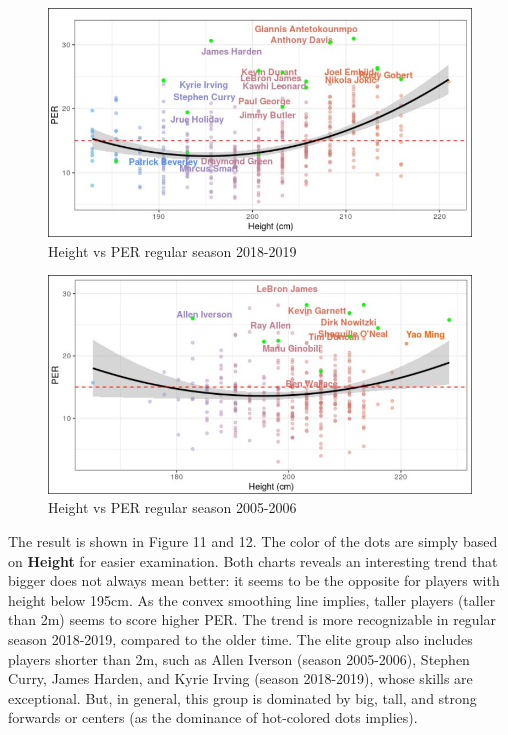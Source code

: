 \documentclass[a4paper,12pt,twoside]{article}
\numberwithin{equation}{section}
\begin{document}
\begin{figure}[h]
\caption{Height vs PER regular season 2018-2019}
\includegraphics[scale=0.4]{hvsper06.jpg}
\centering
\end{figure}
\begin{figure}[h]
\caption{Height vs PER regular season 2005-2006}
\includegraphics[scale=0.4]{hvsper.jpg}
\centering
\end{figure}

 
The result is shown in Figure 11 and 12. The color of the dots are simply based on \textbf{Height} for easier examination. Both charts reveals an interesting trend that bigger does not always mean better: it seems to be the opposite for players with height below 195cm. As the convex smoothing line implies, taller players (taller than 2m) seems to score higher PER. The trend is more recognizable in regular season 2018-2019, compared to the older time. The elite group also includes players shorter than 2m, such as Allen Iverson (season 2005-2006), Stephen Curry, James Harden, and Kyrie Irving (season 2018-2019), whose skills are exceptional. But, in general, this group is dominated by big, tall, and strong forwards or centers (as the dominance of hot-colored dots implies).
\end{document}

